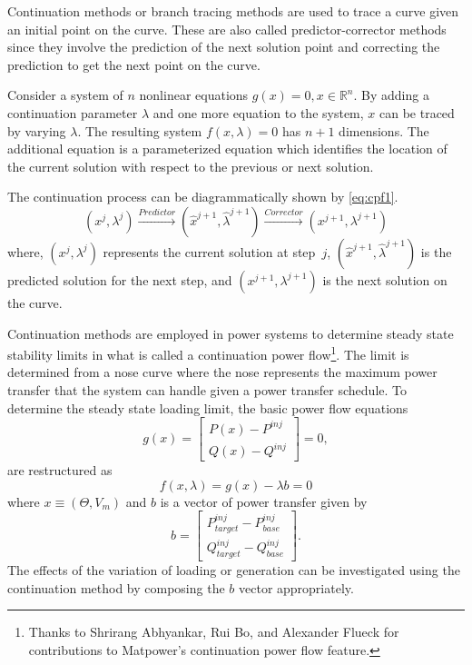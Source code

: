 \documentclass[12pt]{article}
\newcommand{\matpower}[0]{{\sc Matpower}}
\numberwithin{equation}{section}
\numberwithin{table}{section}
\numberwithin{figure}{section}
\begin{document}
Continuation methods or branch tracing methods are used to trace a curve given an initial point on the curve. These are also called predictor-corrector methods since they involve the prediction of the next solution point and correcting the prediction to get the next point on the curve.

Consider a system of $n$ nonlinear equations $g(x) = 0, x \in \mathbb{R}^n$. By adding a continuation parameter $\lambda$ and one more equation to the system, $x$ can be traced by varying $\lambda$. The resulting system $f(x,\lambda)=0$ has $n + 1$ dimensions. The additional equation is a parameterized equation which identifies the location of the current solution with respect to the previous or next solution.

The continuation process can be diagrammatically shown by \eqref{eq:cpf1}.
\begin{equation}
\left(x^j,\lambda^j\right) \xrightarrow{Predictor} (\hat{x}^{j+1},\hat{\lambda}^{j+1}) \xrightarrow{Corrector} \left({x}^{j+1},{\lambda}^{j+1}\right)
\label{eq:cpf1}
\end{equation}
where, $\left(x^j,\lambda^j\right)$ represents the current solution at step~$j$, $(\hat{x}^{j+1},\hat{\lambda}^{j+1})$ is the predicted solution for the next step, and $({x}^{j+1},{\lambda}^{j+1})$ is the next solution on the curve.

Continuation methods are employed in power systems to determine steady state stability limits \cite{ajjarapu1992} in what is called a continuation power flow\footnote{Thanks to Shrirang Abhyankar, Rui Bo, and Alexander Flueck for contributions to \matpower{}'s continuation power flow feature.}. The limit is determined from a nose curve where the nose represents the maximum power transfer that the system can handle given a power transfer schedule. To determine the steady state loading limit, the basic power flow equations
\begin{equation}  g(x) = \left[ \begin{array}{c}
P(x) - P^{inj} \\
Q(x) - Q^{inj}  \end{array} \right] = 0,
\label{eq:pf}
\end{equation}
are restructured as 
\begin{equation}
f(x,\lambda) = g(x) - \lambda{b} = 0
\label{eq:fxlam}
\end{equation}
where $x \equiv \left(\Theta, V_m\right)$ and $b$ is a vector of power transfer given by
\begin{equation}  b = \left[ \begin{array}{c}
P_{target}^{inj} - P_{base}^{inj} \\
Q_{target}^{inj} - Q_{base}^{inj}  \end{array} \right].
\label{eq:Sxfr}
\end{equation}
The effects of the variation of loading or generation can be investigated using the continuation method by composing the $b$ vector appropriately.
\end{document}
